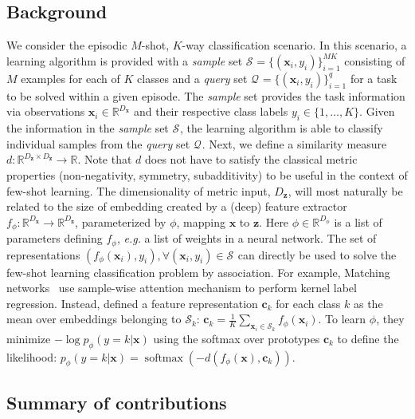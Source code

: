 \documentclass{article}
\renewcommand{\vec}[1]{\mathbf{#1}}
\newcommand{\examples}[1]{\mathcal{S}_{#1}}
\newcommand{\query}[1]{\mathcal{Q}_{#1}}
\newcommand{\querysize}{q}
\newcommand{\featuresize}{{D_{\vec{z}}}}
\newcommand{\imagesize}{{D_{\vec{x}}}}
\newcommand{\phisize}{{D_{\phi}}}
\DeclareMathOperator{\softmax}{softmax}
\begin{document}
\subsection{Background} \label{ssec:definitions}

We consider the episodic $M$-shot, $K$-way classification scenario. In this scenario, a learning algorithm is provided with a \emph{sample} set $\examples{} = \{(\vec{x}_i, y_i) \}_{i=1}^{MK}$ consisting of $M$ examples for each of $K$ classes and a \emph{query} set $\query{} = \{(\vec{x}_i, y_i) \}_{i=1}^{\querysize}$ for a task to be solved within a given episode. The \emph{sample} set provides the task information via observations $\vec{x}_i \in \mathbb{R}^\imagesize$ and their respective class labels $y_i \in \{1, \ldots, K\}$. Given the information in the \emph{sample} set $\examples{}$, the learning algorithm is able to classify individual samples from the \emph{query} set $\query{}$. Next, we define a similarity measure $d : \mathbb{R}^{\featuresize \times \featuresize} \rightarrow \mathbb{R}$. Note that $d$ does not have to satisfy the classical metric properties (non-negativity, symmetry, subadditivity) to be useful in the context of few-shot learning. The dimensionality of metric input, $\featuresize$, will most naturally be related to the size of embedding created by a (deep) feature extractor $f_{\phi} : \mathbb{R}^{\imagesize} \rightarrow \mathbb{R}^{\featuresize}$, parameterized by $\phi$, mapping $\vec{x}$ to $\vec{z}$. Here $\phi \in \mathbb{R}^{\phisize}$ is a list of parameters defining $f_{\phi}$, \emph{e.g.} a list of weights in a neural network. The set of representations $(f_{\phi}(\vec{x}_i), y_i), \forall (\vec{x}_i, y_i) \in \examples{}$ can directly be used to solve the few-shot learning classification problem by association. For example, Matching networks~\citep{vinyals2016matching} use sample-wise attention mechanism to perform kernel label regression. Instead, \citet{snell2017prototypical} defined a feature representation $\vec{c}_k$ for each class $k$ as the mean over embeddings belonging to $\examples{k}$: $\vec{c}_k = \frac{1}{K} \sum_{\vec{x}_i \in \examples{k}} f_{\phi}(\vec{x}_i)$. To learn $\phi$, they minimize $-\log p_\phi (y=k | \vec{x})$ using the softmax over prototypes $\mathbf{c}_k$ to define the likelihood: $p_\phi (y=k | \vec{x}) = \softmax(-d(f_{\phi}(\vec{x}), \mathbf{c}_k))$.


\subsection{Summary of contributions} \label{ssec:summary_of_contributions}
\end{document}

